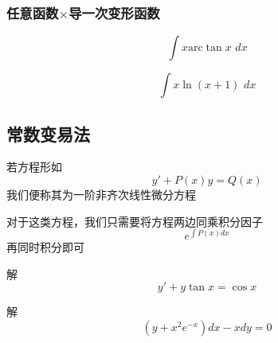 \documentclass[lang=cn,14pt]{elegantbook}
\begin{document}
	\subsubsection{任意函数$\times$导一次变形函数}
	\begin{example}
		\begin{equation*}
			\int{x\mathrm{arc}\tan x\,\,dx}
		\end{equation*}
	\end{example}
	\vspace{2cm}
	\begin{example}
		\begin{equation*}
			\int{x\ln \left( x+1 \right) \,\,dx}
		\end{equation*}
	\end{example}
	\vspace{2cm}
	\subsection{常数变易法}
	\begin{definition}[一阶非齐次线性微分方程]
		若方程形如
		\begin{equation*}
			y'+P\left( x \right) y=Q\left( x \right) 
		\end{equation*}
		我们便称其为一阶非齐次线性微分方程
	\end{definition}
	\begin{remark}
		对于这类方程，我们只需要将方程两边同乘积分因子
		\begin{equation*}
			e^{\int{P\left( x \right) dx}}
		\end{equation*}
		再同时积分即可
	\end{remark}
	\begin{example}
		解\begin{equation*}
			y'+y\tan x=\cos x
		\end{equation*}
	\end{example}
	\vspace{2cm}
	\begin{example}
		解\begin{equation*}
			\left( y+x^2e^{-x} \right) dx-xdy=0
		\end{equation*}
	\end{example}
	\vspace{2cm}
\end{document}
